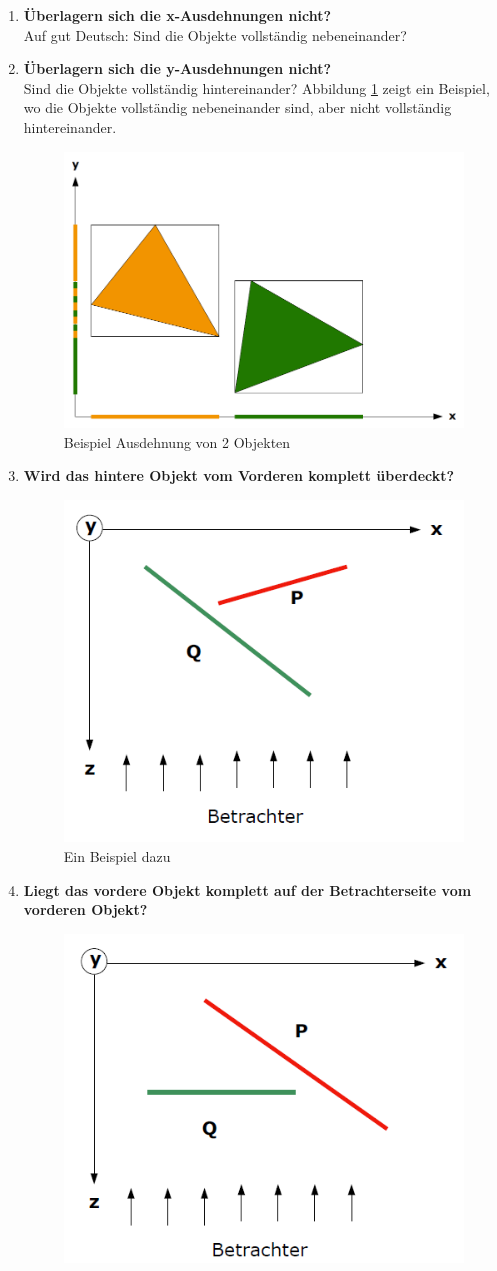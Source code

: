 \begin{enumerate}
	\item \textbf{Überlagern sich die x-Ausdehnungen nicht?} \\
	Auf gut Deutsch: Sind die Objekte vollständig nebeneinander?
	\item \textbf{Überlagern sich die y-Ausdehnungen nicht?} \\
	Sind die Objekte vollständig hintereinander? Abbildung \ref{fig:ausdehnungen} zeigt ein Beispiel, wo die Objekte vollständig nebeneinander sind, aber nicht vollständig hintereinander.
	\begin{figure}[!ht]
		\centering
		\includegraphics[width=0.5\linewidth]{fig/ausdehnungen}
		\caption{Beispiel Ausdehnung von 2 Objekten}
		\label{fig:ausdehnungen}
	\end{figure}
	\item \textbf{Wird das hintere Objekt vom Vorderen komplett überdeckt?}\\
	\begin{figure}[!ht]
		\centering
		\includegraphics[width=0.5\linewidth]{fig/tiefensortierung_3}
		\caption{Ein Beispiel dazu}
		\label{fig:tiefensortierung_3}
	\end{figure}
	\item \textbf{Liegt das vordere Objekt komplett auf der Betrachterseite vom vorderen Objekt?}\\
	\begin{figure}[!ht]
		\centering
		\includegraphics[width=0.5\linewidth]{fig/tiefensortierung_4}

\end{figure}
\end{enumerate}
